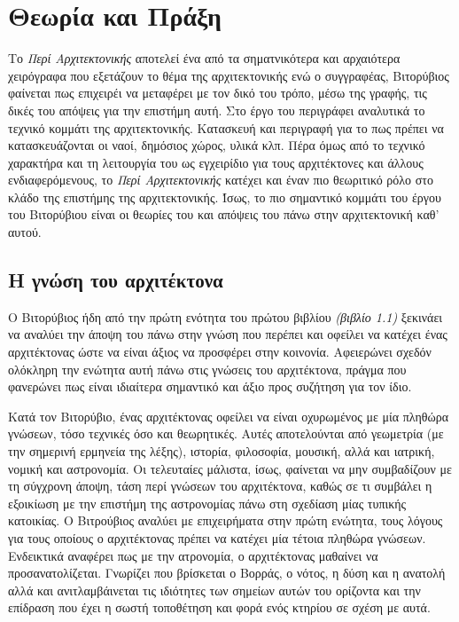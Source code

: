 \section{Θεωρία και Πράξη}

\cite{graham-education,vitruvius-lefas,masterson_status_2004,}

Το \emph{Περί Αρχιτεκτονικής} αποτελεί ένα από τα σηματνικότερα και αρχαιότερα χειρόγραφα που εξετάζουν το θέμα της αρχιτεκτονικής ενώ ο συγγραφέας, Βιτορύβιος φαίνεται πως επιχειρέι να μεταφέρει με τον δικό του τρόπο, μέσω της γραφής, τις δικές του απόψεις για την επιστήμη αυτή. Στο έργο του περιγράφει αναλυτικά το τεχνικό κομμάτι της αρχιτεκτονικής. Κατασκευή και περιγραφή για το πως πρέπει να κατασκευάζονται οι ναοί, δημόσιος χώρος, υλικά κλπ. Πέρα όμως από το τεχνικό χαρακτήρα και τη λειτουργία του ως εγχειρίδιο για τους αρχιτέκτονες και άλλους ενδιαφερόμενους, το \emph{Περί Αρχιτεκτονικής} κατέχει και έναν πιο θεωριτικό ρόλο στο κλάδο της επιστήμης της αρχιτεκτονικής. Ίσως, το πιο σημαντικό κομμάτι του έργου του Βιτορύβιου είναι οι θεωρίες του και απόψεις του πάνω στην αρχιτεκτονική καθ' αυτού. 

\subsection{Η γνώση του αρχιτέκτονα}

Ο Βιτορύβιος ήδη από την πρώτη ενότητα του πρώτου βιβλίου \emph{(βιβλίο 1.1)} ξεκινάει να αναλύει την άποψη του πάνω στην γνώση που περέπει και οφείλει να κατέχει ένας αρχιτέκτονας ώστε να είναι άξιος να προσφέρει στην κοινονία. Αφειερώνει σχεδόν ολόκληρη την ενώτητα αυτή πάνω στις γνώσεις του αρχιτέκτονα, πράγμα που φανερώνει πως είναι ιδιαίτερα σημαντικό και άξιο προς συζήτηση για τον ίδιο.

Κατά τον Βιτορύβιο, ένας αρχιτέκτονας οφείλει να είναι οχυρωμένος με μία πληθώρα γνώσεων, τόσο τεχνικές όσο και θεωρητικές. Αυτές αποτελούνται από γεωμετρία (με την σημερινή ερμηνεία της λέξης), ιστορία, φιλοσοφία, μουσική, αλλά και ιατρική, νομική και αστρονομία. \cite[σ. 392]{masterson_status_2004} Οι τελευταίες μάλιστα, ίσως, φαίνεται να μην συμβαδίζουν με τη σύγχρονη άποψη, τάση περί γνώσεων του αρχιτέκτονα, καθώς σε τι συμβάλει η εξοικίωση με την επιστήμη της αστρονομίας πάνω στη σχεδίαση μίας τυπικής κατοικίας. Ο Βιτρούβιος αναλύει με επιχειρήματα στην πρώτη ενώτητα, τους λόγους για τους οποίους ο αρχιτέκτονας πρέπει να κατέχει μία τέτοια πληθώρα γνώσεων. Ενδεικτικά αναφέρει πως με την ατρονομία, ο αρχιτέκτονας μαθαίνει να προσανατολίζεται. Γνωρίζει που βρίσκεται ο Βορράς, ο νότος, η δύση και η ανατολή αλλά και ανιτλαμβάινεται τις ιδιότητες των σημείων αυτών του ορίζοντα και την επίδραση που έχει η σωστή τοποθέτηση και φορά ενός κτηρίου σε σχέση με αυτά. \cite[σ. 43]{vitruvius-lefas}

